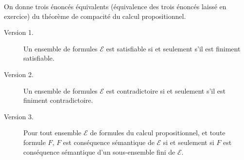 \documentclass[./main]{subfiles}
\begin{document}
  \begin{thm}
    \label{chap1-comp}
    On donne trois énoncés équivalents (équivalence des trois énoncés laissé en exercice) du théorème de compacité du calcul propositionnel.

    \begin{description}
      \item[Version 1.] Un ensemble de formules $\mathcal{E}$ est satisfiable si et seulement s'il est finiment satisfiable.
      \item[Version 2.] Un ensemble de formules $\mathcal{E}$ est contradictoire si et seulement s'il est finiment contradictoire.
      \item[Version 3.] Pour tout ensemble $\mathcal{E}$ de formules du calcul propositionnel, et toute formule $F$, $F$ est conséquence sémantique de $\mathcal{E}$ si et seulement si $F$ est conséquence sémantique d'un sous-ensemble fini de $\mathcal{E}$.
    \end{description}
  \end{thm}
\end{document}
